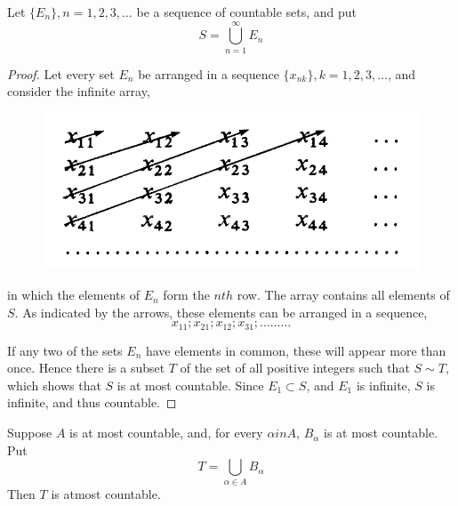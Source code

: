 \begin{thm}
	\label{count}
	Let $\{E_n\}, n = 1, 2, 3,\dots$ be a sequence of countable sets, and put
	$$ S = \bigcup_{n=1}^{\infty} E_n $$
	\begin{proof}
		Let every set $E_n$ be arranged in a sequence $\{x_{nk}\}, k = 1, 2, 3,\dots$, 
		and consider the infinite array,		
		\begin{figure}[ht!]
			\centering
			\includegraphics[scale=0.5]{./images/chapter_2_figure_1.png}
		\end{figure}
		in which the elements of $E_n$ form the $nth$ row.
		The array contains all elements of $S$. As indicated by the arrows, 
		these elements can be arranged in a sequence,
		$$ x_{11} ; x_{21}; x_{12}; x_{31}; \dots\dots\dots $$

		If any two of the sets $E_n$ have elements in common, 
		these will appear more than once. 
		Hence there is a subset $T$ of the set of all positive integers 
		such that $S \sim T$, which shows that $S$ is at most countable. 
		Since $E_1 \subset S$, and $E_1$ is infinite, $S$ is infinite, and thus countable.
	\end{proof}
\end{thm}

\begin{cor}
	Suppose $A$ is at most countable, and, for every $\alpha in A$, $B_{\alpha}$ is at most countable.
	Put $$ T = \bigcup_{\alpha \in A} B_{\alpha} $$
	Then $T$ is atmost countable.
\end{cor}

